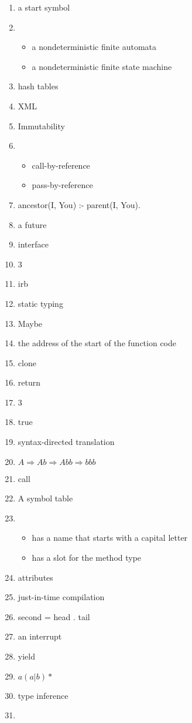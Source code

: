\documentclass{exam}
\begin{document}
\begin{enumerate}
\item a start symbol
\item \begin{itemize}
\item a nondeterministic finite automata
\item a nondeterministic finite state machine
\end{itemize}
\item hash tables
\item XML
\item Immutability
\item \begin{itemize}
\item call-by-reference
\item pass-by-reference
\end{itemize}
\item ancestor(I, You) :- parent(I, You).
\item a future
\item interface
\item 3
\item irb
\item static typing
\item Maybe
\item the address of the start of the function code
\item clone
\item return
\item 3
\item true
\item syntax-directed translation
\item $A \Rightarrow Ab \Rightarrow Abb \Rightarrow bbb$
\item call
\item A symbol table
\item \begin{itemize}
\item has a name that starts with a capital letter
\item has a slot for the method type
\end{itemize}
\item attributes
\item just-in-time compilation
\item second = head . tail
\item an interrupt
\item yield
\item $a (a|b)*$
\item type inference
\item \begin{itemize}

\end{itemize}
\end{enumerate}
\end{document}

